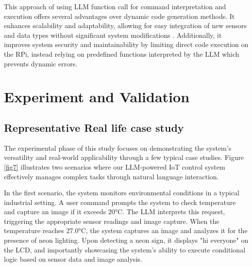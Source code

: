 \documentclass{ieeeaccess}
\begin{document}
This approach of using LLM function call for command interpretation and execution offers several advantages over dynamic code generation methods. It enhances scalability and adaptability, allowing for easy integration of new sensors and data types without significant system modifications \cite{yang2023autogptonlinedecisionmaking}. Additionally, it improves system security and maintainability by limiting direct code execution on the RPi, instead relying on predefined functions interpreted by the LLM which prevents dynamic errors.




\section{Experiment and Validation}\label{sec:experiment}

\subsection{Representative Real life case study}
The experimental phase of this study focuses on demonstrating the system's versatility and real-world applicability through a few typical case studies. Figure \ref{fig7} illustrates two scenarios where our LLM-powered IoT control system effectively manages complex tasks through natural language interaction.

In the first scenario, the system monitors environmental conditions in a typical industrial setting. A user command prompts the system to check temperature and capture an image if it exceeds 20°C. The LLM interprets this request, triggering the appropriate sensor readings and image capture. When the temperature reaches 27.0°C, the system captures an image and analyzes it for the presence of neon lighting. Upon detecting a neon sign, it displays "hi everyone" on the LCD, and importantly showcasing the system's ability to execute conditional logic based on sensor data and image analysis.
\end{document}
